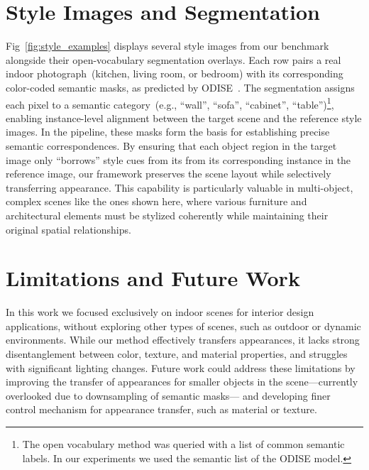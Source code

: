 \section{Style Images and Segmentation}
\label{sec:design_style}

Fig~\ref{fig:style_examples} displays several style images from our \dataset benchmark alongside their open-vocabulary segmentation overlays.
Each row pairs a real indoor photograph~(kitchen, living room, or bedroom) with its corresponding color-coded semantic masks, as predicted by ODISE~\cite{xu2023open}.
The segmentation assigns each pixel to a semantic category~(e.g., ``wall'', ``sofa'', ``cabinet'', ``table'')\footnote{The open vocabulary method was queried with a list of common semantic labels. In our experiments we used the semantic list of the ODISE model.}, enabling instance-level alignment between the target scene and the reference style images.
In the \ours pipeline, these masks form the basis  for establishing precise semantic correspondences.
By ensuring that each object region in the target image only “borrows” style cues from its from its corresponding instance in the reference image, our framework preserves the scene layout while selectively transferring appearance.
This capability is particularly valuable in multi-object, complex scenes like the ones shown here, where various furniture and architectural elements must be stylized coherently while maintaining their original spatial relationships.


\section{Limitations and Future Work}
\label{sec:limitation}
In this work we focused exclusively on indoor scenes for interior design applications, without exploring other types of scenes, such as outdoor or dynamic environments.
While our method effectively transfers appearances, it lacks strong disentanglement between color, texture, and material properties, and struggles with significant lighting changes.
Future work could address these limitations by improving the transfer of appearances for smaller objects in the scene---currently overlooked due to downsampling of semantic masks--- and developing finer control mechanism for appearance transfer, such as material or texture.
